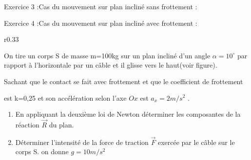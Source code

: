 \documentclass[12pt, french]{article}
\begin{document}
\begin{Box2}{Exercice 3 :Cas du mouvement sur plan incliné sans frottement : }
\end{Box2}


\begin{Box2}{Exercice 4 :Cas du mouvement sur plan incliné avec frottement : }


\begin{wrapfigure}[3]{r}{0.33\textwidth}
	\vspace{-0.8cm}
	\newcommand{\ang}{30}
 
\end{wrapfigure}
On tire un corps S de masse m=100kg sur un plan incliné d'un angle $\alpha=10^{\circ}$
par rapport à l'horizontale par un câble et il glisse vers le haut(voir figure).


Sachant que le contact se fait avec frottement et que le coefficient de frottement 

est k=0,25 et son accélération selon l'axe $Ox$
est $a_x=2m/s^2$ .

\begin{enumerate}
	\item  En appliquant la deuxième loi de Newton déterminer les composantes de la réaction $\vec{R}$
du plan.

\item  Déterminer l'intensité de la force de traction $\vec{F}$
exercée par le câble sur le corps S. on donne $g=10m/s^2$
\end{enumerate}
\end{Box2}
\end{document}
